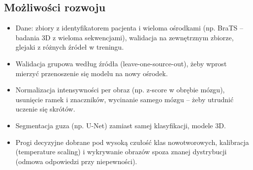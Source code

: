 \subsection*{Możliwości rozwoju}
\begin{itemize}
\item Dane: zbiory z identyfikatorem pacjenta i wieloma ośrodkami (np. BraTS -- badania 3D
  z wieloma sekwencjami), walidacja na zewnętrznym zbiorze, glejaki z różnych źródeł w treningu.
\item Walidacja grupowa według źródła (leave-one-source-out), żeby wprost mierzyć
  przenoszenie się modelu na nowy ośrodek.
\item Normalizacja intensywności per obraz (np. z-score w obrębie mózgu), usunięcie ramek
  i znaczników, wycinanie samego mózgu -- żeby utrudnić uczenie się skrótów.
\item Segmentacja guza (np. U-Net) zamiast samej klasyfikacji, modele 3D.
\item Progi decyzyjne dobrane pod wysoką czułość klas nowotworowych, kalibracja
  (temperature scaling) i wykrywanie obrazów spoza znanej dystrybucji (odmowa odpowiedzi
  przy niepewności).
\end{itemize}
